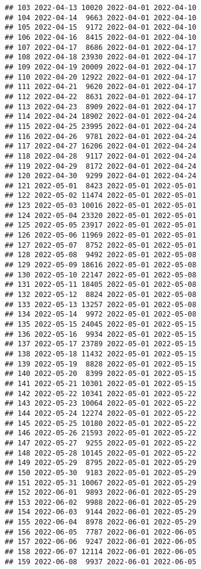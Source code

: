 \documentclass[
]{article}
\begin{document}
\begin{verbatim}
## 103 2022-04-13 10020 2022-04-01 2022-04-10
## 104 2022-04-14  9663 2022-04-01 2022-04-10
## 105 2022-04-15  9172 2022-04-01 2022-04-10
## 106 2022-04-16  8415 2022-04-01 2022-04-10
## 107 2022-04-17  8686 2022-04-01 2022-04-17
## 108 2022-04-18 23930 2022-04-01 2022-04-17
## 109 2022-04-19 20009 2022-04-01 2022-04-17
## 110 2022-04-20 12922 2022-04-01 2022-04-17
## 111 2022-04-21  9620 2022-04-01 2022-04-17
## 112 2022-04-22  8631 2022-04-01 2022-04-17
## 113 2022-04-23  8909 2022-04-01 2022-04-17
## 114 2022-04-24 18902 2022-04-01 2022-04-24
## 115 2022-04-25 23995 2022-04-01 2022-04-24
## 116 2022-04-26  9781 2022-04-01 2022-04-24
## 117 2022-04-27 16206 2022-04-01 2022-04-24
## 118 2022-04-28  9117 2022-04-01 2022-04-24
## 119 2022-04-29  8172 2022-04-01 2022-04-24
## 120 2022-04-30  9299 2022-04-01 2022-04-24
## 121 2022-05-01  8423 2022-05-01 2022-05-01
## 122 2022-05-02 11474 2022-05-01 2022-05-01
## 123 2022-05-03 10016 2022-05-01 2022-05-01
## 124 2022-05-04 23320 2022-05-01 2022-05-01
## 125 2022-05-05 23917 2022-05-01 2022-05-01
## 126 2022-05-06 11969 2022-05-01 2022-05-01
## 127 2022-05-07  8752 2022-05-01 2022-05-01
## 128 2022-05-08  9492 2022-05-01 2022-05-08
## 129 2022-05-09 18616 2022-05-01 2022-05-08
## 130 2022-05-10 22147 2022-05-01 2022-05-08
## 131 2022-05-11 18405 2022-05-01 2022-05-08
## 132 2022-05-12  8824 2022-05-01 2022-05-08
## 133 2022-05-13 13257 2022-05-01 2022-05-08
## 134 2022-05-14  9972 2022-05-01 2022-05-08
## 135 2022-05-15 24045 2022-05-01 2022-05-15
## 136 2022-05-16  9934 2022-05-01 2022-05-15
## 137 2022-05-17 23789 2022-05-01 2022-05-15
## 138 2022-05-18 11432 2022-05-01 2022-05-15
## 139 2022-05-19  8828 2022-05-01 2022-05-15
## 140 2022-05-20  8399 2022-05-01 2022-05-15
## 141 2022-05-21 10301 2022-05-01 2022-05-15
## 142 2022-05-22 10341 2022-05-01 2022-05-22
## 143 2022-05-23 10064 2022-05-01 2022-05-22
## 144 2022-05-24 12274 2022-05-01 2022-05-22
## 145 2022-05-25 10180 2022-05-01 2022-05-22
## 146 2022-05-26 21593 2022-05-01 2022-05-22
## 147 2022-05-27  9255 2022-05-01 2022-05-22
## 148 2022-05-28 10145 2022-05-01 2022-05-22
## 149 2022-05-29  8795 2022-05-01 2022-05-29
## 150 2022-05-30  9183 2022-05-01 2022-05-29
## 151 2022-05-31 10067 2022-05-01 2022-05-29
## 152 2022-06-01  9893 2022-06-01 2022-05-29
## 153 2022-06-02  9988 2022-06-01 2022-05-29
## 154 2022-06-03  9144 2022-06-01 2022-05-29
## 155 2022-06-04  8978 2022-06-01 2022-05-29
## 156 2022-06-05  7787 2022-06-01 2022-06-05
## 157 2022-06-06  9247 2022-06-01 2022-06-05
## 158 2022-06-07 12114 2022-06-01 2022-06-05
## 159 2022-06-08  9937 2022-06-01 2022-06-05

\end{verbatim}
\end{document}
